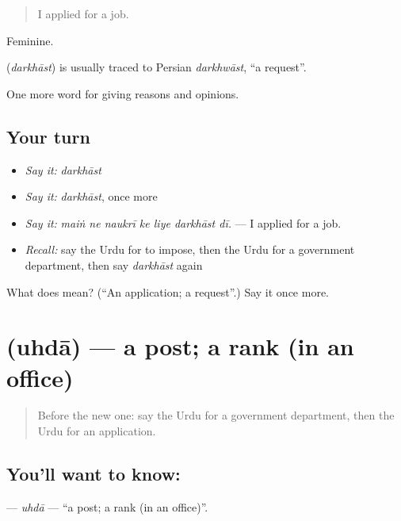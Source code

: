 \begin{quote}
I applied for a job.
\end{quote}

Feminine.

\begin{cousinweb}
\textbf{} (\emph{darkhāst}) is usually traced to Persian \emph{darkhwāst}, \textquotedblleft{}a request\textquotedblright{}.
\end{cousinweb}

\begin{grammarlens}[title={What you've built}]
One more word for giving reasons and opinions.
\end{grammarlens}

\subsection*{Your turn}
\begin{itemize}
\raggedright
  \item \emph{Say it:} \emph{darkhāst}
  \item \emph{Say it:} \emph{darkhāst}, once more
  \item \emph{Say it:} \emph{maiṅ ne naukrī ke liye darkhāst dī.} — I applied for a job.
  \item \emph{Recall:} say the Urdu for to impose, then the Urdu for a government department, then say \emph{darkhāst} again
\end{itemize}

\begin{tcolorbox}[breakable,colback=teal!4,colframe=teal!35!black,title={Before you move on}]
What does  mean? (\textquotedblleft{}An application; a request\textquotedblright{}.) Say it once more.
\end{tcolorbox}
\section[\texorpdfstring{\ur{عہدہ} (uhdā)}{عہدہ (uhdā)}]{ (uhdā) — a post; a rank (in an office)}

\label{lesson:UR-C343-uhda}



\begin{quote}
Before the new one: say the Urdu for a government department, then the Urdu for an application.
\end{quote}

\subsection*{You'll want to know: }
\textbf{} — \emph{uhdā} — \textquotedblleft{}a post; a rank (in an office)\textquotedblright{}.

